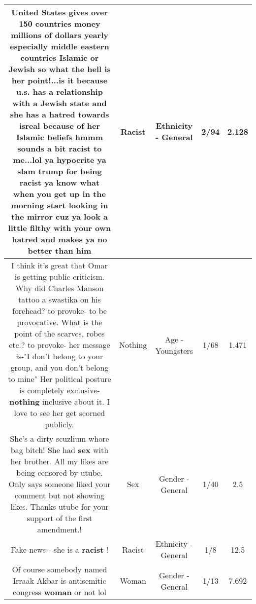 \documentclass[11pt]{article}
\newlength\mylength
\begin{document}
\begin{center}
\begin{longtable}{|C{.65\mylength}|C{.30\mylength}|C{.12\mylength}|C{.12\mylength}|C{.12\mylength}|}
  \small United States gives over 150 countries money millions of dollars yearly especially middle eastern countries Islamic or Jewish so what the hell is her point!...is it because u.s.  has a relationship with a Jewish state and she has a hatred towards isreal because of her Islamic beliefs hmmm sounds a bit \textbf{racist} to me...lol ya hypocrite ya slam trump for being \textbf{racist} ya know what when you get up in the morning start looking in the mirror cuz ya look a little filthy with your own hatred and makes ya no better than him\normalsize   & Racist & Ethnicity - General & 2/94 & 2.128 \\  \hline
  \small I think it's great that Omar is getting public criticism. Why did Charles Manson tattoo a swastika on his forehead? to provoke- to be provocative. What is the point of the scarves, robes etc.? to provoke- her message is-"I don't belong to your group, and you don't belong to mine"  Her political posture is completely exclusive- \textbf{nothing} inclusive about it. I love to see her get scorned publicly.\normalsize   & Nothing & Age - Youngsters & 1/68 & 1.471 \\  \hline
  \small She's a dirty scuzlium whore bag bitch! She had \textbf{sex} with her brother. All my likes are being censored by utube. Only says someone liked your comment but not showing likes. Thanks utube for your support of the first amendment.!\normalsize   & Sex & Gender - General & 1/40 & 2.5 \\  \hline
  \small Fake news - she is a \textbf{racist} !\normalsize   & Racist & Ethnicity - General & 1/8 & 12.5 \\  \hline
  \small Of course somebody named Irraak Akbar is antisemitic congress \textbf{woman} or not lol\normalsize   & Woman & Gender - General & 1/13 & 7.692 \\  \hline

\end{longtable}
\end{center}
\end{document}
